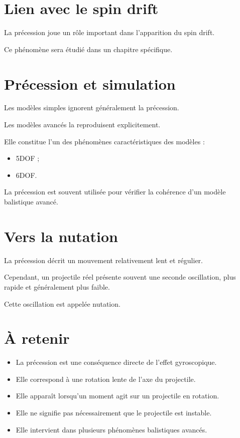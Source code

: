 \section{Lien avec le spin drift}

La précession joue un rôle important dans l'apparition du spin drift.

Ce phénomène sera étudié dans un chapitre spécifique.

\section{Précession et simulation}

Les modèles simples ignorent généralement la précession.

Les modèles avancés la reproduisent explicitement.

Elle constitue l'un des phénomènes caractéristiques des modèles :

\begin{itemize}
    \item 5DOF ;
    \item 6DOF.
\end{itemize}

\begin{simulation}

La précession est souvent utilisée pour vérifier la cohérence d'un modèle
balistique avancé.

\end{simulation}

\section{Vers la nutation}

La précession décrit un mouvement relativement lent et régulier.

Cependant, un projectile réel présente souvent une seconde oscillation,
plus rapide et généralement plus faible.

Cette oscillation est appelée nutation.

\section{À retenir}

\begin{aretenir}

\begin{itemize}
    \item La précession est une conséquence directe de l'effet gyroscopique.
    \item Elle correspond à une rotation lente de l'axe du projectile.
    \item Elle apparaît lorsqu'un moment agit sur un projectile en rotation.
    \item Elle ne signifie pas nécessairement que le projectile est instable.
    \item Elle intervient dans plusieurs phénomènes balistiques avancés.
\end{itemize}

\end{aretenir}

